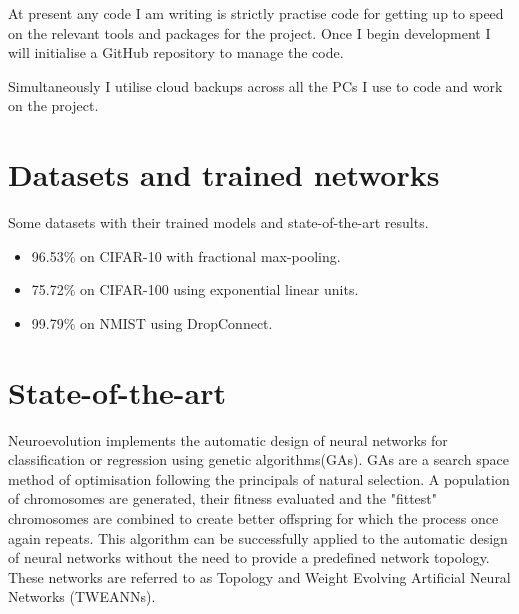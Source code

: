 \documentclass[]{monthly-report}
\begin{document}
At present any code I am writing is strictly practise code for getting up to speed on the relevant tools and packages for the project. Once I begin development I will initialise a GitHub repository to manage the code. 

Simultaneously I utilise cloud backups across all the PCs I use to code and work on the project.

\section{Datasets and trained networks}

Some datasets with their trained models and state-of-the-art results.
\begin{itemize}

\item 96.53\% on CIFAR-10 with fractional max-pooling.~\cite{DBLP:journals/corr/Graham14a}

\item 75.72\% on CIFAR-100 using exponential linear units.~\cite{DBLP:journals/corr/ClevertUH15}

\item 99.79\% on NMIST using DropConnect.~\cite{icml2013_wan13}

\end{itemize}



\section{State-of-the-art}
Neuroevolution implements the automatic design of neural networks for classification or regression using genetic algorithms(GAs)\cite{Stanley2017}. GAs are a search space method of optimisation following the principals of natural selection. A population of chromosomes are generated, their fitness evaluated and the "fittest" chromosomes are combined to create better offspring for which the process once again repeats. This algorithm can be successfully applied to the automatic design of neural networks without the need to provide a predefined network topology. These networks are referred to as Topology and Weight Evolving Artificial Neural Networks (TWEANNs).   
\end{document}
